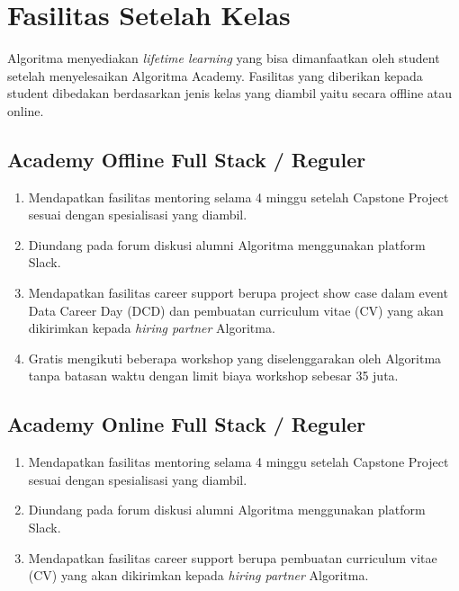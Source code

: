 \documentclass[
]{book}
\providecommand{\tightlist}{%
  \setlength{\itemsep}{0pt}\setlength{\parskip}{0pt}}
\begin{document}
\hypertarget{fasilitas-setelah-kelas}{%
\section{Fasilitas Setelah Kelas}\label{fasilitas-setelah-kelas}}

Algoritma menyediakan \emph{lifetime learning} yang bisa dimanfaatkan oleh student setelah menyelesaikan Algoritma Academy. Fasilitas yang diberikan kepada student dibedakan berdasarkan jenis kelas yang diambil yaitu secara offline atau online.

\hypertarget{academy-offline-full-stack-reguler}{%
\subsection{Academy Offline Full Stack / Reguler}\label{academy-offline-full-stack-reguler}}

\begin{enumerate}
\def\labelenumi{\arabic{enumi}.}
\tightlist
\item
  Mendapatkan fasilitas mentoring selama 4 minggu setelah Capstone Project sesuai dengan spesialisasi yang diambil.
\item
  Diundang pada forum diskusi alumni Algoritma menggunakan platform Slack.
\item
  Mendapatkan fasilitas career support berupa project show case dalam event Data Career Day (DCD) dan pembuatan curriculum vitae (CV) yang akan dikirimkan kepada \emph{hiring partner} Algoritma.
\item
  Gratis mengikuti beberapa workshop yang diselenggarakan oleh Algoritma tanpa batasan waktu dengan limit biaya workshop sebesar 35 juta.
\end{enumerate}

\hypertarget{academy-online-full-stack-reguler}{%
\subsection{Academy Online Full Stack / Reguler}\label{academy-online-full-stack-reguler}}

\begin{enumerate}
\def\labelenumi{\arabic{enumi}.}
\tightlist
\item
  Mendapatkan fasilitas mentoring selama 4 minggu setelah Capstone Project sesuai dengan spesialisasi yang diambil.
\item
  Diundang pada forum diskusi alumni Algoritma menggunakan platform Slack.
\item
  Mendapatkan fasilitas career support berupa pembuatan curriculum vitae (CV) yang akan dikirimkan kepada \emph{hiring partner} Algoritma.
\end{enumerate}
\end{document}
